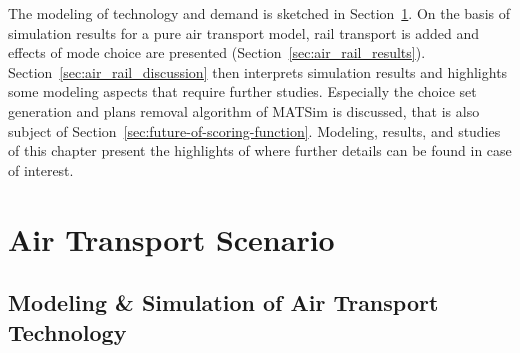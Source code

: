 The modeling of technology and demand is sketched in Section~\ref{sec:air_rail_scenario}. 
On the basis of simulation results for a pure air transport model, rail transport is added and effects of mode choice are presented (Section~\ref{sec:air_rail_results}). 
Section~\ref{sec:air_rail_discussion} then interprets simulation results and highlights some modeling aspects that require further studies. 
Especially the choice set generation and plans removal algorithm of MATSim is discussed, that is also subject of Section~\ref{sec:future-of-scoring-function}. 
Modeling, results, and studies of this chapter present the highlights of \citet[][Chapter~6, pp.~119]{Grether2014PhD} where further details can be found in case of interest.   

\section{Air Transport Scenario}
\label{sec:air_rail_scenario}

\subsection{Modeling \& Simulation of Air Transport Technology}
\label{sec:modeling-of-technology}

